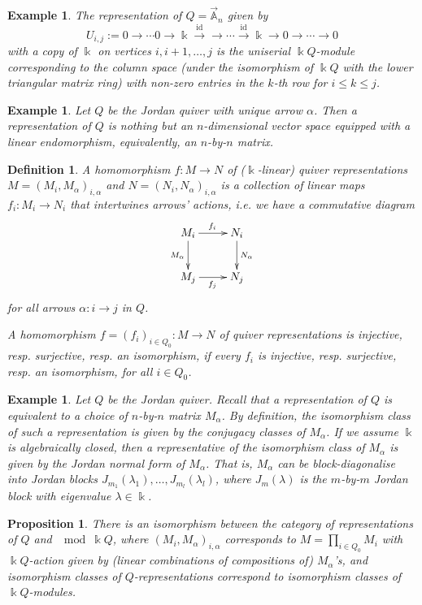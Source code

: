 \documentclass[11pt,a4paper]{article}
\numberwithin{equation}{section}
\theoremstyle{all}
\newtheorem{proposition}[theorem]{Proposition}
\newtheorem{example}[theorem]{Example}
\newtheorem{definition}[theorem]{Definition}
\theoremstyle{remark}
\newcommand{\id}{\operatorname{id}}
\newcommand{\defn}[1]{\textsl{\color{darkblue} #1}}
\begin{document}
\begin{example}
The representation of $Q=\vec{\mathbb{A}}_n$ given by 
\[
U_{i,j}:=0\to \cdots 0\to \Bbbk \xrightarrow{\id} \to \cdots \xrightarrow{\id} \Bbbk \to 0\to\cdots \to 0
\]
with a copy of $\Bbbk$ on vertices $i,i+1,\ldots, j$ is the uniserial $\Bbbk Q$-module corresponding to the column space (under the isomorphism of $\Bbbk Q$ with the lower triangular matrix ring) with non-zero entries in the $k$-th row for $i\leq k\leq j$.
\end{example}

\begin{example}
Let $Q$ be the Jordan quiver with unique arrow $\alpha$.
Then a representation of $Q$ is nothing but an $n$-dimensional vector space equipped with a linear endomorphism, equivalently, an $n$-by-$n$ matrix.
\end{example}

\begin{definition}
A \defn{homomorphism} $f:M\to N$ of ($\Bbbk$-linear) quiver representations $M=(M_i,M_\alpha)_{i,\alpha}$ and $N=(N_i,N_\alpha)_{i,\alpha}$ is a collection of linear maps $f_i:M_i\to N_i$ that intertwines arrows' actions, i.e. we have a commutative diagram
\[
\xymatrix{ M_i \ar[r]^{f_i} \ar[d]_{M_\alpha} & N_i\ar[d]^{N_\alpha}\\
M_j \ar[r]_{f_j} & N_j}
\]
for all arrows $\alpha:i\to j$ in $Q$.

A homomorphism $f=(f_i)_{i\in Q_0}:M\to N$ of quiver representations is \defn{injective}, resp. \defn{surjective}, resp. an \defn{isomorphism}, if every $f_i$ is injective, resp. surjective, resp. an isomorphism, for all $i\in Q_0$.
\end{definition}

\begin{example}
Let $Q$ be the Jordan quiver.
Recall that a representation of $Q$ is equivalent to a choice of $n$-by-$n$ matrix $M_\alpha$.
By definition, the isomorphism class of such a representation is given by the conjugacy classes of $M_\alpha$.
If we assume $\Bbbk$ is algebraically closed, then a representative of the isomorphism class of $M_\alpha$ is given by the Jordan normal form of $M_\alpha$.  That is, $M_\alpha$ can be block-diagonalise into Jordan blocks $J_{m_1}(\lambda_1),\ldots, J_{m_l}(\lambda_l)$, where $J_m(\lambda)$ is the $m$-by-$m$ Jordan block with eigenvalue $\lambda\in \Bbbk$.
\end{example}

\begin{proposition}
There is an isomorphism between the category of representations of $Q$ and $\mod\Bbbk Q$, where $(M_i,M_\alpha)_{i,\alpha}$ corresponds to $M=\prod_{i\in Q_0} M_i$ with $\Bbbk Q$-action given by (linear combinations of compositions of) $M_\alpha$'s, and isomorphism classes of $Q$-representations correspond to isomorphism classes of $\Bbbk Q$-modules.
\end{proposition}
\end{document}
